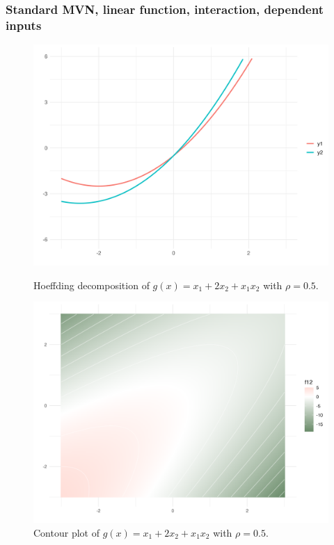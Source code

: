 \subsubsection*{Standard MVN, linear function, interaction, dependent inputs}
\begin{figure}[htpb]
    \centering
    \begin{minipage}[t]{0.49\textwidth}
        \centering
        \includegraphics[width=\textwidth]{images/hoeffding_rho05.png}
        \caption{Hoeffding decomposition of $g(x) = x_1 + 2 x_2 + x_1 x_2$ with $\rho = 0.5$.}
        \label{fig:hoeffding_rho05}
    \end{minipage}%
    \hfill
    \begin{minipage}[t]{0.49\textwidth}
        \centering
        \includegraphics[width=\textwidth]{images/hoeffding_contour_rho05.png}
        \caption{Contour plot of $g(x) = x_1 + 2 x_2 + x_1 x_2$ with $\rho = 0.5$.}
        \label{fig:hoeffding_contour_rho05}
    \end{minipage}
\end{figure}

